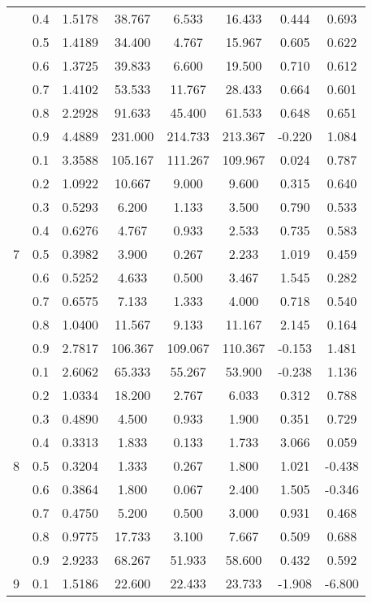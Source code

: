 \documentclass[11pt,a4paper]{report}
\begin{document}
\begin{longtable}{ | c | c || c | c | c | c | c | c | }
 & 0.4 & 1.5178 & 38.767 & 6.533 & 16.433 & 0.444 & 0.693 \\
 & 0.5 & 1.4189 & 34.400 & 4.767 & 15.967 & 0.605 & 0.622 \\
 & 0.6 & 1.3725 & 39.833 & 6.600 & 19.500 & 0.710 & 0.612 \\
 & 0.7 & 1.4102 & 53.533 & 11.767 & 28.433 & 0.664 & 0.601 \\
 & 0.8 & 2.2928 & 91.633 & 45.400 & 61.533 & 0.648 & 0.651 \\
 & 0.9 & 4.4889 & 231.000 & 214.733 & 213.367 & -0.220 & 1.084 \\
 \hline
\multirow{9}{*}{7} & 0.1 & 3.3588 & 105.167 & 111.267 & 109.967 & 0.024 & 0.787 \\
 & 0.2 & 1.0922 & 10.667 & 9.000 & 9.600 & 0.315 & 0.640 \\
 & 0.3 & 0.5293 & 6.200 & 1.133 & 3.500 & 0.790 & 0.533 \\
 & 0.4 & 0.6276 & 4.767 & 0.933 & 2.533 & 0.735 & 0.583 \\
 & 0.5 & 0.3982 & 3.900 & 0.267 & 2.233 & 1.019 & 0.459 \\
 & 0.6 & 0.5252 & 4.633 & 0.500 & 3.467 & 1.545 & 0.282 \\
 & 0.7 & 0.6575 & 7.133 & 1.333 & 4.000 & 0.718 & 0.540 \\
 & 0.8 & 1.0400 & 11.567 & 9.133 & 11.167 & 2.145 & 0.164 \\
 & 0.9 & 2.7817 & 106.367 & 109.067 & 110.367 & -0.153 & 1.481 \\
 \hline
\multirow{9}{*}{8} & 0.1 & 2.6062 & 65.333 & 55.267 & 53.900 & -0.238 & 1.136 \\
 & 0.2 & 1.0334 & 18.200 & 2.767 & 6.033 & 0.312 & 0.788 \\
 & 0.3 & 0.4890 & 4.500 & 0.933 & 1.900 & 0.351 & 0.729 \\
 & 0.4 & 0.3313 & 1.833 & 0.133 & 1.733 & 3.066 & 0.059 \\
 & 0.5 & 0.3204 & 1.333 & 0.267 & 1.800 & 1.021 & -0.438 \\
 & 0.6 & 0.3864 & 1.800 & 0.067 & 2.400 & 1.505 & -0.346 \\
 & 0.7 & 0.4750 & 5.200 & 0.500 & 3.000 & 0.931 & 0.468 \\
 & 0.8 & 0.9775 & 17.733 & 3.100 & 7.667 & 0.509 & 0.688 \\
 & 0.9 & 2.9233 & 68.267 & 51.933 & 58.600 & 0.432 & 0.592 \\
 \hline
\multirow{9}{*}{9} & 0.1 & 1.5186 & 22.600 & 22.433 & 23.733 & -1.908 & -6.800 \\

\end{longtable}
\end{document}
